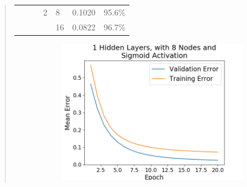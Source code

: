 \documentclass{article}
\begin{document}
\begin{quote}
\begin{table}[h]
\begin{tabular}{|c|c|c|c|l|c|c|}
			&                       &                                                         & 2                                                       & 8                                                                              & 0.1020                                                    & 95.6\%                                                   \\ \cline{5-7} 
			\multicolumn{1}{|l|}{}                                        & \multicolumn{1}{l|}{} & \multicolumn{1}{l|}{}                                   & \multicolumn{1}{l|}{}                                   & 16                                                                             & 0.0822                                                    & 96.7\%                                                   \\ \hline
		\end{tabular}
	\end{table}
\setlength{\parindent}{10ex}
\begin{figure}[h!]
\centering
\begin{subfigure}[h]{0.23\textwidth}
	\includegraphics[width=\textwidth]{figs/Cancer_Binary_Classification_1_Hidden_Layers_with_8_Nodes_and_Sigmoid_Activation.png}
\end{subfigure}
%
\begin{subfigure}[h]{0.23\textwidth}

\end{subfigure}
\end{figure}
\end{quote}
\end{document}
